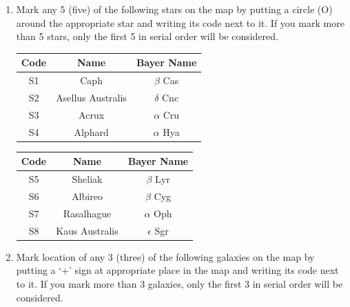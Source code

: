 \documentclass[a4paper,12pt]{extarticle}
\begin{document}
\begin{enumerate}
    \item Mark any 5 (five) of the following stars on the map by putting a circle (O) around the appropriate star and writing its code next to it. If you mark more than 5 stars, only the first 5 in serial order will be considered.
 
 \begin{table}[H]
 	\centering
 	\begin{minipage}{0.45\textwidth}
 		\centering
 		\begin{tabular}{|c|c|c|}
 			\hline
 			\textbf{Code} & \textbf{Name} & \textbf{Bayer Name} \\
 			\hline
 			S1 & Caph & $\beta$ Cas \\
 			S2 & Asellus Australis & $\delta$ Cnc \\
 			S3 & Acrux & $\alpha$ Cru \\
 			S4 & Alphard & $\alpha$ Hya \\
 			\hline
 		\end{tabular}
 	\end{minipage}
 	\hspace{0.02\textwidth}
 	\begin{minipage}{0.45\textwidth}
 		\centering
 		\begin{tabular}{|c|c|c|}
 			\hline
 			\textbf{Code} & \textbf{Name} & \textbf{Bayer Name} \\
 			\hline
 			S5 & Sheliak & $\beta$ Lyr \\
 			S6 & Albireo & $\beta$ Cyg \\
 			S7 & Rasalhague & $\alpha$ Oph \\
 			S8 & Kaus Australis & $\epsilon$ Sgr \\
 			\hline
 		\end{tabular}
 	\end{minipage}
 \end{table}   
    
    \item  Mark location of any 3 (three) of the following galaxies on the map by putting a ‘+’ sign at appropriate place in the map and writing its code next to it. If you mark more than 3 galaxies, only the first 3 in serial order will be considered.
 

\end{enumerate}
\end{document}

